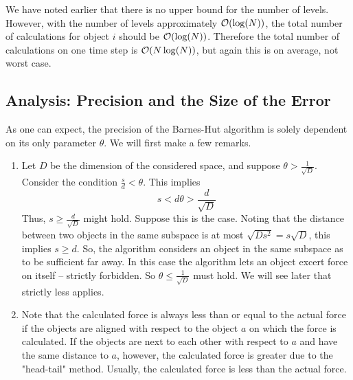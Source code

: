 We have noted earlier that there is no upper bound for the number of levels. However, with the number of levels approximately $\mathcal{O}(\log(N))$, the total number of calculations for object $i$ should be $\mathcal{O}(\log(N))$. Therefore the total number of calculations on one time step is $\mathcal{O}(N\log(N))$, but again this is on average, not worst case.
\subsection{Analysis: Precision and the Size of the Error}
As one can expect, the precision of the Barnes-Hut algorithm is solely dependent on its only parameter $\theta$. We will first make a few remarks.
\begin{enumerate}
\item Let $D$ be the dimension of the considered space, and suppose $\theta > \frac{1}{\sqrt{D}}$. Consider the condition $\frac{s}{d} < \theta$. This implies
\[
s < d\theta > \frac{d}{\sqrt{D}}
\]
Thus, $s\geq \frac{d}{\sqrt{D}}$ might hold. Suppose this is the case. Noting that the distance between two objects in the same subspace is at most $\sqrt{Ds^2} = s\sqrt{D}$, this implies $s\geq d$. So, the algorithm considers an object in the same subspace as to be sufficient far away. In this case the algorithm lets an object excert force on itself -- strictly forbidden. So $\theta \leq \frac{1}{\sqrt{D}}$ must hold. We will see later that strictly less applies.
\item Note that the calculated force is always less than or equal to the actual force if the objects are aligned with respect to the object $a$ on which the force is calculated. If the objects are next to each other with respect to $a$ and have the same distance to $a$, however, the calculated force is greater due to the "head-tail" method. Usually, the calculated force is less than the actual force.


\end{enumerate}
